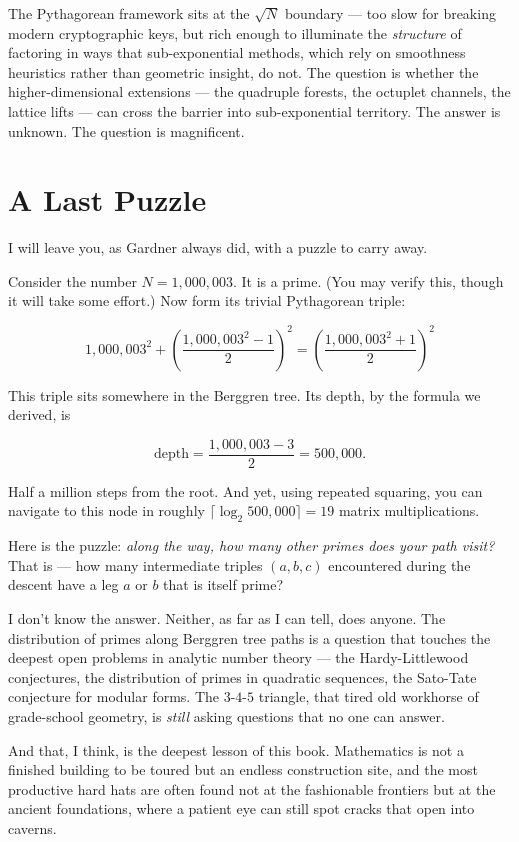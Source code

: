 The Pythagorean framework sits at the $\sqrt{N}$ boundary --- too slow for breaking modern cryptographic keys, but rich enough to illuminate the \textit{structure} of factoring in ways that sub-exponential methods, which rely on smoothness heuristics rather than geometric insight, do not. The question is whether the higher-dimensional extensions --- the quadruple forests, the octuplet channels, the lattice lifts --- can cross the barrier into sub-exponential territory. The answer is unknown. The question is magnificent.


\bigskip


\section{A Last Puzzle}

I will leave you, as Gardner always did, with a puzzle to carry away.

Consider the number $N = 1{,}000{,}003$. It is a prime. (You may verify this, though it will take some effort.) Now form its trivial Pythagorean triple:

\[
1{,}000{,}003^2 + \left(\frac{1{,}000{,}003^2 - 1}{2}\right)^{\!2} = \left(\frac{1{,}000{,}003^2 + 1}{2}\right)^{\!2}
\]

This triple sits somewhere in the Berggren tree. Its depth, by the formula we derived, is

\[
\text{depth} = \frac{1{,}000{,}003 - 3}{2} = 500{,}000.
\]

Half a million steps from the root. And yet, using repeated squaring, you can navigate to this node in roughly $\lceil \log_2 500{,}000 \rceil = 19$ matrix multiplications.

Here is the puzzle: \textit{along the way, how many other primes does your path visit?} That is --- how many intermediate triples $(a, b, c)$ encountered during the descent have a leg $a$ or $b$ that is itself prime?

I don't know the answer. Neither, as far as I can tell, does anyone. The distribution of primes along Berggren tree paths is a question that touches the deepest open problems in analytic number theory --- the Hardy-Littlewood conjectures, the distribution of primes in quadratic sequences, the Sato-Tate conjecture for modular forms. The $3$-$4$-$5$ triangle, that tired old workhorse of grade-school geometry, is \textit{still} asking questions that no one can answer.

And that, I think, is the deepest lesson of this book. Mathematics is not a finished building to be toured but an endless construction site, and the most productive hard hats are often found not at the fashionable frontiers but at the ancient foundations, where a patient eye can still spot cracks that open into caverns.

